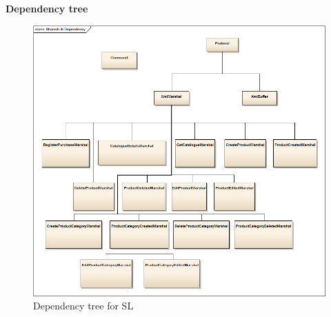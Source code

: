 \textbf{Dependency tree}
\begin{figure}[H]
	\centering
	\includegraphics[width=1\textwidth]{Test/SharedLib/Integrationstest/SharedLib_Dependency.png}
	\caption{Dependency tree for \gls{SL}}
	\label{fig:SL-dependencies}
\end{figure}

